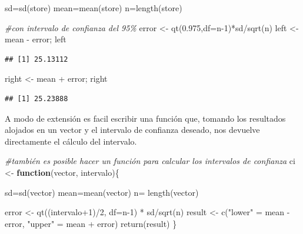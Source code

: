 \documentclass[
]{book}
\newenvironment{Shaded}{\begin{snugshade}}{\end{snugshade}}
\newcommand{\AttributeTok}[1]{\textcolor[rgb]{0.77,0.63,0.00}{#1}}
\newcommand{\CommentTok}[1]{\textcolor[rgb]{0.56,0.35,0.01}{\textit{#1}}}
\newcommand{\ControlFlowTok}[1]{\textcolor[rgb]{0.13,0.29,0.53}{\textbf{#1}}}
\newcommand{\DecValTok}[1]{\textcolor[rgb]{0.00,0.00,0.81}{#1}}
\newcommand{\FloatTok}[1]{\textcolor[rgb]{0.00,0.00,0.81}{#1}}
\newcommand{\FunctionTok}[1]{\textcolor[rgb]{0.00,0.00,0.00}{#1}}
\newcommand{\NormalTok}[1]{#1}
\newcommand{\OtherTok}[1]{\textcolor[rgb]{0.56,0.35,0.01}{#1}}
\newcommand{\SpecialCharTok}[1]{\textcolor[rgb]{0.00,0.00,0.00}{#1}}
\newcommand{\StringTok}[1]{\textcolor[rgb]{0.31,0.60,0.02}{#1}}
\begin{document}
\begin{Shaded}
\begin{Highlighting}[]
\NormalTok{sd}\OtherTok{=}\FunctionTok{sd}\NormalTok{(store)}
\NormalTok{mean}\OtherTok{=}\FunctionTok{mean}\NormalTok{(store)}
\NormalTok{n}\OtherTok{=}\FunctionTok{length}\NormalTok{(store)}

\CommentTok{\#con intervalo de confianza del 95\%}
\NormalTok{error }\OtherTok{\textless{}{-}} \FunctionTok{qt}\NormalTok{(}\FloatTok{0.975}\NormalTok{,}\AttributeTok{df=}\NormalTok{n}\DecValTok{{-}1}\NormalTok{)}\SpecialCharTok{*}\NormalTok{sd}\SpecialCharTok{/}\FunctionTok{sqrt}\NormalTok{(n)}
\NormalTok{left }\OtherTok{\textless{}{-}}\NormalTok{ mean }\SpecialCharTok{{-}}\NormalTok{ error; left}
\end{Highlighting}
\end{Shaded}

\begin{verbatim}
## [1] 25.13112
\end{verbatim}

\begin{Shaded}
\begin{Highlighting}[]
\NormalTok{right }\OtherTok{\textless{}{-}}\NormalTok{ mean }\SpecialCharTok{+}\NormalTok{ error; right}
\end{Highlighting}
\end{Shaded}

\begin{verbatim}
## [1] 25.23888
\end{verbatim}

A modo de extensión es facil escribir una función que, tomando los resultados alojados en un vector y el intervalo de confianza deseado, nos devuelve directamente el cálculo del intervalo.

\begin{Shaded}
\begin{Highlighting}[]
\CommentTok{\#también es posible hacer un función para calcular los intervalos de confianza}
\NormalTok{ci }\OtherTok{\textless{}{-}} \ControlFlowTok{function}\NormalTok{(vector, intervalo)\{}
  
\NormalTok{  sd}\OtherTok{=}\FunctionTok{sd}\NormalTok{(vector)}
\NormalTok{  mean}\OtherTok{=}\FunctionTok{mean}\NormalTok{(vector)}
\NormalTok{  n}\OtherTok{=} \FunctionTok{length}\NormalTok{(vector)}
  
\NormalTok{  error }\OtherTok{\textless{}{-}} \FunctionTok{qt}\NormalTok{((intervalo}\SpecialCharTok{+}\DecValTok{1}\NormalTok{)}\SpecialCharTok{/}\DecValTok{2}\NormalTok{, }\AttributeTok{df=}\NormalTok{n}\DecValTok{{-}1}\NormalTok{) }\SpecialCharTok{*}\NormalTok{ sd}\SpecialCharTok{/}\FunctionTok{sqrt}\NormalTok{(n)}
\NormalTok{  result }\OtherTok{\textless{}{-}} \FunctionTok{c}\NormalTok{(}\StringTok{"lower"} \OtherTok{=}\NormalTok{ mean }\SpecialCharTok{{-}}\NormalTok{ error, }\StringTok{"upper"} \OtherTok{=}\NormalTok{ mean }\SpecialCharTok{+}\NormalTok{ error)}
  \FunctionTok{return}\NormalTok{(result)}
\NormalTok{\}}
\end{Highlighting}
\end{Shaded}
\end{document}
